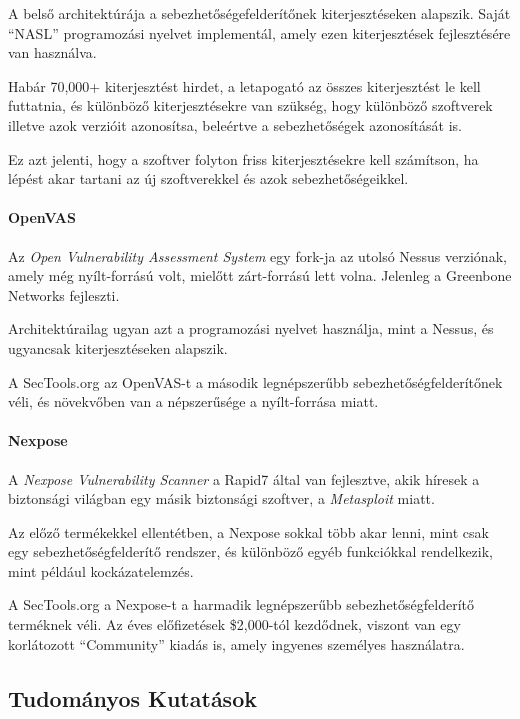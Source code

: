 	A belső architektúrája a sebezhetőségefelderítőnek kiterjesztéseken alapszik. Saját ``NASL'' programozási nyelvet implementál, amely ezen kiterjesztések fejlesztésére van használva.
	
	Habár 70,000+ kiterjesztést hirdet, a letapogató az összes kiterjesztést le kell futtatnia, és különböző kiterjesztésekre van szükség, hogy különböző szoftverek illetve azok verzióit azonosítsa, beleértve a sebezhetőségek azonosítását is.
	
	Ez azt jelenti, hogy a szoftver folyton friss kiterjesztésekre kell számítson, ha lépést akar tartani az új szoftverekkel és azok sebezhetőségeikkel.
	
	\paragraph*{OpenVAS} Az \textit{Open Vulnerability Assessment System}\cite{openvas} egy fork-ja az utolsó Nessus verziónak, amely még nyílt-forrású volt, mielőtt zárt-forrású lett volna. Jelenleg a Greenbone Networks fejleszti.
	
	Architektúrailag ugyan azt a programozási nyelvet használja, mint a Nessus, és ugyancsak kiterjesztéseken alapszik.
	
	A SecTools.org az OpenVAS-t a második legnépszerűbb sebezhetőségfelderítőnek véli, és növekvőben van a népszerűsége a nyílt-forrása miatt.
	
	\paragraph*{Nexpose} A \textit{Nexpose Vulnerability Scanner}\cite{nexpose} a Rapid7 által van fejlesztve, akik híresek a biztonsági világban egy másik biztonsági szoftver, a \textit{Metasploit} miatt.
	
	Az előző termékekkel ellentétben, a Nexpose sokkal több akar lenni, mint csak egy sebezhetőségfelderítő rendszer, és különböző egyéb funkciókkal rendelkezik, mint például kockázatelemzés.
	
	A SecTools.org a Nexpose-t a harmadik legnépszerűbb sebezhetőségfelderítő terméknek véli. Az éves előfizetések \$2,000-tól kezdődnek, viszont van egy korlátozott ``Community'' kiadás is, amely ingyenes személyes használatra.
	
\subsection*{Tudományos Kutatások}
	
